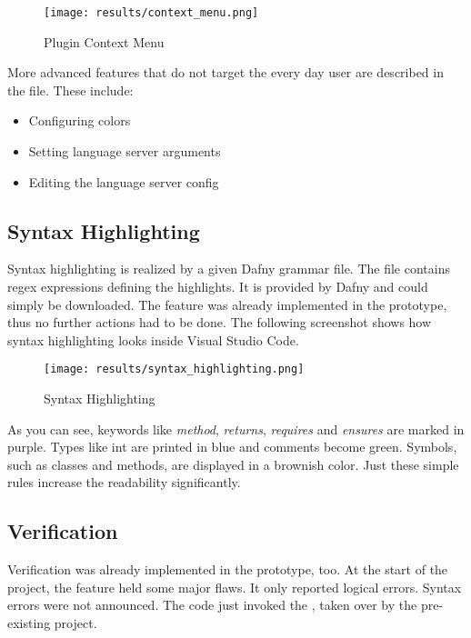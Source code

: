 \begin{figure}[H]
    \centering
    \texttt{[image: results/context\_menu.png]}
    \caption{Plugin Context Menu}
    \label{fig:result_contextmenu}
\end{figure}

More advanced features that do not target the every day user are described in the  file.
These include:
\begin{itemize}
    \item Configuring colors
    \item Setting language server arguments
    \item Editing the language server config
\end{itemize}

\subsection{Syntax Highlighting}
\label{section:result:syntaxhighgliht}
Syntax highlighting is realized by a given Dafny grammar file.
The file contains regex expressions defining the highlights.
It is provided by Dafny  and could simply be downloaded.
The feature was already implemented in the prototype, thus no further actions had to be done.
The following screenshot shows how syntax highlighting looks inside Visual Studio Code.

\begin{figure}[H]
    \centering
    \texttt{[image: results/syntax\_highlighting.png]}
    \caption{Syntax Highlighting}
    \label{fig:result_syntax_highlight}
\end{figure}

As you can see, keywords like \textit{method}, \textit{returns}, \textit{requires} and \textit{ensures} are marked in purple.
Types like int are printed in blue and comments become green.
Symbols, such as classes and methods, are displayed in a brownish color.
Just these simple rules increase the readability significantly.


\subsection{Verification}
Verification was already implemented in the prototype, too.
At the start of the project, the feature held some major flaws.
It only reported logical errors.
Syntax errors were not announced.
The code just invoked the , taken over by the pre-existing project.\\

